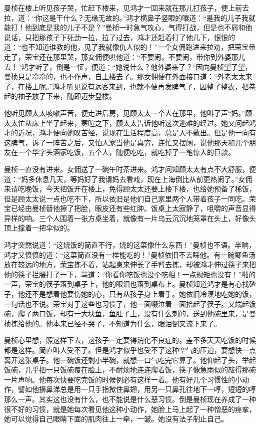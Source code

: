 \par 曼桢在楼上听见孩子哭，忙赶下楼来，见鸿才一回来就在那儿打孩子，便上前去拉，道：“你这是干什么？无缘无故的。”鸿才横鼻子竖眼的嚷道：“是我的儿子我就能打！他到底是我的儿子不是？”曼桢一时急气攻心，气得打战，但是也不屑和他说话，只把那孩子下死劲一拉，拉了过去，鸿才还赶着打了他几下，恨恨的道：“也不知道谁教的他，见了我就像仇人似的！”一个女佣跑进来拉劝，把荣宝带走了，荣宝还在那里哭，那女佣便哄他道：“不要闹，不要闹，带你到外婆那儿去！”鸿才听了，倒是一怔，便道：“她说什么？他外婆来了？”因向曼桢望了望，曼桢只是冷冷的，也不作声，自上楼去了。那女佣便在外面接口道：“外老太太来了，在楼上呢。”鸿才听见说有远客来到，也就不便再发脾气了，因整了整衣，把卷起的袖子放了下来，随即迈步登楼。
\par 他听见顾太太咳嗽声音，便走进后房，见顾太太一个人在那里，他叫了声“妈。”顾太太忙从床上坐了起来，寒暄之下，顾太太告诉他听这次逃难的经过。她又问起鸿才的近况，鸿才便向她叹苦经，说现在生活程度高，总是入不敷出。但是他一向有这脾气，诉了一阵苦之后，又怕人家当他是真穷，连忙又摆阔，说他那天和几个朋友在一个华字头酒家吃饭，五个人，随便吃吃，就吃掉了一笔惊人的巨款。
\par 曼桢一直没有进来。女佣送了一碗午时茶进来。鸿才问知顾太太有点不大舒服，便道：“妈多休息几天，等妈好了我请妈去看戏，现在上海倒比从前更热闹了。”女佣来请吃晚饭，今天把饭开在楼上，免得顾太太还要上楼下楼，也给她预备了稀饭，但是顾太太说一点也吃不下，所以依旧是他们自己家里两个人带着孩子一同吃。荣宝已经由曼桢替他擦了把脸，眼皮还有些红肿。饭桌上太寂静了，咀嚼的声音显得异样的响。三个人围着一张方桌坐着，就像有一片乌云沉沉地笼罩在头上，好像头顶上撑着一把伞似的。
\par 鸿才突然说道：“这烧饭的简直不行，烧的这菜像什么东西！”曼桢也不语。半晌，鸿才又愤愤的道：“这菜简直没有一样能吃的！”曼桢依旧不去睬他。有一碗鲫鱼汤放在较远的地方，荣宝拣不着，站起身来伸长了手臂去拣，却被鸿才伸过筷子来把他的筷子拦腰打了一下，骂道：“你看你吃饭也没个吃相！一点规矩也没有！”啪的一声，荣宝的筷子落到桌子上，他的眼泪也落到桌布上。曼桢知道鸿才是有心找碴子，他还不是想着他要伤她的心，只有从孩子身上着手。她依旧冷漠地吃她的饭，一句话也不说。荣宝对于这些也习惯了，他一面啜泣着一面拾起了筷子。又端起饭碗，爬了两口饭，却有一大块鱼，鱼肚子上，没有什么刺的，送到他碗里来，是曼桢拣给他的。他本来已经不哭了，不知道为什么，眼泪倒又流下来了。
\par 曼桢心里想，照这样下去，这孩子一定要得消化不良症的。差不多天天吃饭的时候都是这样。简直叫人受不了。但是鸿才似乎也受不了这种空气的压迫，要想快一点离开这张桌子。他一碗饭还剩小半碗，就想一口气吃完它算了。他仰起了头，举起饭碗，几乎把一只饭碗覆在脸上，不耐烦地连连爬着饭，筷子像急雨似的敲得那碗一片声响。他每次快要吃完饭的时候例必有这样一着。他有好几个习惯性的小动作，譬如他擤鼻涕总是用一只手指揿住鼻翅，用另一只鼻孔往地下一哼，短短的哼那么一声。其实这也没有什么，也不能说是什么恶习惯。倒是曼桢现在养成了一种很不好的习惯，就是她每次看见他这种小动作，她脸上马上起了一种憎恶的痉挛，她可以觉得自己眼睛下面的肌肉往上一牵，一皱。她没有法子制止自己。
